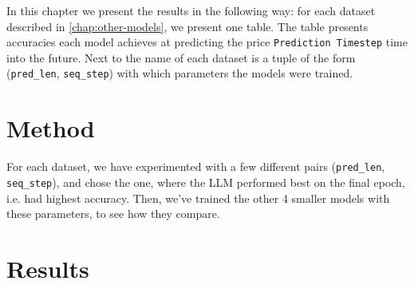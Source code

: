 In this chapter we present the results in the following way: for each dataset described in \autoref{chap:other-models}, we present one table. The table presents accuracies each model achieves at predicting the price \verb|Prediction Timestep| time into the future. Next to the name of each dataset is a tuple of the form (\verb|pred_len|, \verb|seq_step|) with which parameters the models were trained.
\section{Method}
For each dataset, we have experimented with a few different pairs (\verb|pred_len|, \verb|seq_step|), and chose the one, where the LLM performed best on the final epoch, i.e. had highest accuracy. Then, we've trained the other 4 smaller models with these parameters, to see how they compare.

\section{Results}

